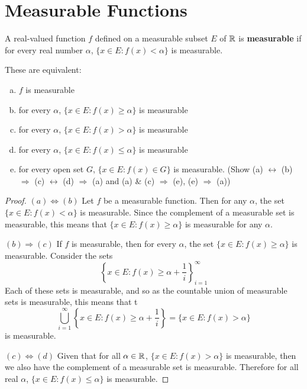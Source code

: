 \chapter{Measurable Functions}
\begin{pblm}%
	A real-valued function $f$ defined on a measurable subset $E$ of $\mathbb{R}$ is 
	\textbf{measurable} if for every real number $\alpha$, 
	$\{x \in E: f(x) < \alpha\}$ is measurable. 
\end{pblm}

\begin{pblm}%
	These are equivalent: 
	\begin{enumerate}[(a)]
	\item $f$ is measurable %
	\item for every $\alpha$, $\{x \in E: f(x) \ge \alpha\}$ is measurable %
	\item for every $\alpha$, $\{x \in E: f(x) > \alpha\}$ is measurable %
	\item for every $\alpha$, $\{x \in E: f(x) \le \alpha\}$ is measurable %
	\item for every open set $G$, $\{x \in E: f(x) \in G\}$ is measurable. %
	(Show (a) $\leftrightarrow$ (b) $\Rightarrow$ (c) $\leftrightarrow$ (d) 
	$\Rightarrow$ (a) and (a) \& (c) $\Rightarrow$ (e), (e) $\Rightarrow$ (a))
	\end{enumerate}
\begin{proof}
	\noindent $(a) \Leftrightarrow (b)$ Let $f$ be a measurable function. Then for 
	any $\alpha$, the set $\{x \in E: f(x) < \alpha\}$ is measurable. Since the 
	complement of a measurable set is measurable, this means that $\{x \in E: f(x) \ge \alpha\}$ 
	is measurable for any $\alpha$. 

	\noindent $(b) \Rightarrow (c)$ 
	If $f$ is measurable, then for every $\alpha$, 
	the set $\{x \in E: f(x) \ge \alpha\}$ is measurable. Consider the sets 
	\begin{equation*}
		\left\{x \in E: f(x) \ge \alpha + \frac{1}{i}\right\}_{i=1}^\infty
	\end{equation*}
	Each of these sets is measurable, and so as the countable union of 
	measurable sets is measurable, this means that t
	\begin{equation*}
		\bigcup\limits_{i=1}^\infty \left\{x \in E : f(x) \ge \alpha + \frac{1}{i}\right\} 
		= \{x \in E: f(x) > \alpha\}
	\end{equation*}
	is measurable.

	\noindent $(c) \Leftrightarrow (d)$ Given that for all $\alpha \in \mathbb{R}$, 
	$\{x \in E: f(x) > \alpha\}$ is measurable, then we also have the complement 
	of a measurable set is measurable. Therefore for 
	all real $\alpha$, $\{x \in E: f(x) \le \alpha\}$ is measurable.  


\end{proof}
\end{pblm}
